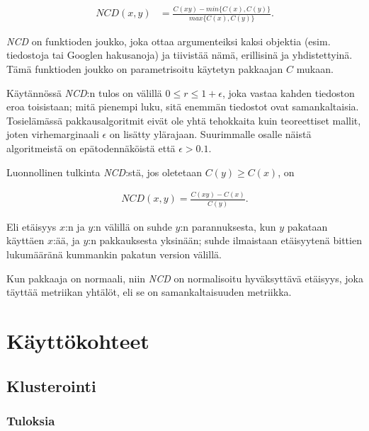 \documentclass[12pt,finnish,draft]{tktltiki2}
\theoremstyle{definition}
\theoremstyle{remark}
\begin{document}
  \begin{align}
    NCD(x,y) &= \frac{C(xy)-min\{C(x),C(y)\}}{max\{C(x),C(y)\}}.
  \end{align}

  \emph{NCD} on funktioden joukko, joka ottaa argumenteiksi kaksi objektia (esim. tiedostoja tai Googlen hakusanoja) ja tiivistää nämä, erillisinä ja yhdistettyinä.
  Tämä funktioden joukko on parametrisoitu käytetyn pakkaajan $C$ mukaan.

  Käytännössä \emph{NCD}:n tulos on välillä $0 \leq r \leq 1+ \epsilon$, joka vastaa kahden tiedoston eroa toisistaan; mitä pienempi luku, sitä enemmän tiedostot ovat samankaltaisia.
  Tosielämässä pakkausalgoritmit eivät ole yhtä tehokkaita kuin teoreettiset mallit, joten virhemarginaali $\epsilon$ on lisätty ylärajaan.
  Suurimmalle osalle näistä algoritmeistä on epätodennäköistä että  $\epsilon > 0.1$.

  Luonnollinen tulkinta \emph{NCD}:stä, jos oletetaan $C(y) \geq C(x)$, on

  \begin{align}
    NCD(x,y) = \frac{C(xy)-C(x)}{C(y)}.
 \end{align}


  Eli etäisyys $x$:n ja $y$:n välillä on suhde $y$:n parannuksesta, kun $y$ pakataan käyttäen $x$:ää, ja $y$:n pakkauksesta yksinään; suhde ilmaistaan etäisyytenä bittien lukumääränä kummankin pakatun version välillä.

  Kun pakkaaja on normaali, niin \emph{NCD} on normalisoitu hyväksyttävä etäisyys, joka täyttää metriikan yhtälöt, eli se on samankaltaisuuden metriikka.



\section{Käyttökohteet} %
\label{sec:k_ytt_kohteet}
  \subsection{Klusterointi} %
  \label{sub:klusterointi}
    \subsubsection{Tuloksia} %
    \label{ssub:tuloksia}
\end{document}
